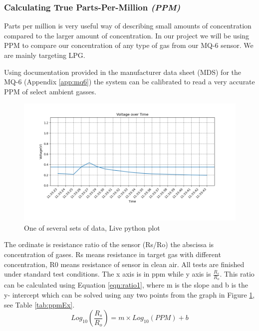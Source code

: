 			\subsubsection{Calculating True Parts-Per-Million \textit{(PPM)}}
				\par Parts per million is very useful way of describing small amounts of concentration compared to the larger amount of concentration. In our project we will be using PPM to compare our concentration of any type of gas from our MQ-6 sensor. We are mainly targeting LPG.
				\par Using documentation provided in the manufacturer data sheet (MDS) for the MQ-6 (Appendix \ref{app:mq6}) the system can be calibrated to read a very accurate PPM of select ambient gasses.
				\begin{figure}[h]
					\centering
					\includegraphics[width=\linewidth]{thdDetect.png}
					\caption{One of several sets of data, Live python plot}
					\label{fig:angGraph}
				\end{figure}
				\par The ordinate is resistance ratio of the sensor (Rs/Ro)  the abscissa is concentration of gases. Rs means resistance in target gas with different concentration, R0 means resistance of sensor in clean air. All tests are finished under standard test conditions. The x axis is in ppm while y axis is $\frac{R_s}{R_o}$. This ratio can be calculated using Equation \ref{eqn:ratio1}, where m is the slope and b is the y- intercept which can be solved using any two points from the graph in Figure \ref{fig:angGraph}, see Table \ref{tab:ppmEx}. \\
				\begin{equation}
				Log_10(\frac{R_s}{R_o}) = m\times Log_10(PPM) + b
				\label{eqn:ratio1}
				\end{equation}
				

